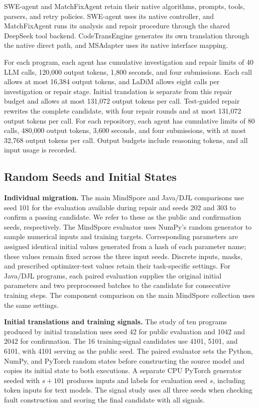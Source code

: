 SWE-agent and MatchFixAgent retain their native algorithms, prompts, tools, parsers, and retry policies. SWE-agent uses its native controller, and MatchFixAgent runs its analysis and repair procedure through the shared DeepSeek tool backend. CodeTransEngine generates its own translation through the native direct path, and MSAdapter uses its native interface mapping.

For each program, each agent has cumulative investigation and repair limits of 40 LLM calls, 120,000 output tokens, 1,800 seconds, and four submissions. Each call allows at most 16,384 output tokens, and LaDiM allows eight calls per investigation or repair stage. Initial translation is separate from this repair budget and allows at most 131,072 output tokens per call. Test-guided repair rewrites the complete candidate, with four repair rounds and at most 131,072 output tokens per call. For each repository, each agent has cumulative limits of 80 calls, 480,000 output tokens, 3,600 seconds, and four submissions, with at most 32,768 output tokens per call. Output budgets include reasoning tokens, and all input usage is recorded.

\subsection{Random Seeds and Initial States}
\label{sec:seeds}

\textbf{Individual migration.} The main MindSpore and Java/DJL comparisons use seed 101 for the evaluation available during repair and seeds 202 and 303 to confirm a passing candidate. We refer to these as the public and confirmation seeds, respectively. The MindSpore evaluator uses NumPy's random generator to sample numerical inputs and training targets. Corresponding parameters are assigned identical initial values generated from a hash of each parameter name; these values remain fixed across the three input seeds. Discrete inputs, masks, and prescribed optimizer-test values retain their task-specific settings. For Java/DJL programs, each paired evaluation supplies the original initial parameters and two preprocessed batches to the candidate for consecutive training steps. The component comparison on the main MindSpore collection uses the same settings.

\textbf{Initial translations and training signals.} The study of ten programs produced by initial translation uses seed 42 for public evaluation and 1042 and 2042 for confirmation. The 16 training-signal candidates use 4101, 5101, and 6101, with 4101 serving as the public seed. The paired evaluator sets the Python, NumPy, and PyTorch random states before constructing the source model and copies its initial state to both executions. A separate CPU PyTorch generator seeded with $s+101$ produces inputs and labels for evaluation seed $s$, including token inputs for text models. The signal study uses all three seeds when checking fault construction and scoring the final candidate with all signals.

